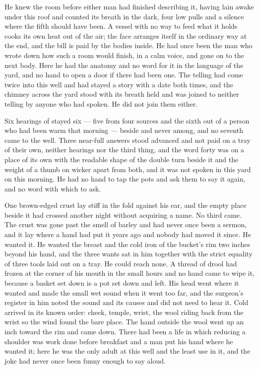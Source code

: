 He knew the room before either man had finished describing it, having lain awake under this roof and counted its breath in the dark, four low pulls and a silence where the fifth should have been. A vessel with no way to feed what it holds cooks its own heat out of the air; the face arranges itself in the ordinary way at the end, and the bill is paid by the bodies inside. He had once been the man who wrote down how such a room would finish, in a calm voice, and gone on to the next body. Here he had the anatomy and no word for it in the language of the yard, and no hand to open a door if there had been one. The telling had come twice into this well and had stayed a story with a date both times, and the chimney across the yard stood with its breath held and was joined to neither telling by anyone who had spoken. He did not join them either.

Six hearings of  stayed six — five from four sources and the sixth out of a person who had been warm that morning — beside and never among, and no seventh came to the well. Three near-full answers stood advanced and not paid on a tray of their own, neither hearings nor the third thing, and the word forty was on a place of its own with the readable shape of the double turn beside it and the weight of a thumb on wicker apart from both, and it was not spoken in this yard on this morning. He had no hand to tap the pots and ask them to say it again, and no  word with which to ask.

\scenebreak

One brown-edged crust lay stiff in the fold against his ear, and the empty place beside it had crossed another night without acquiring a name. No third came. The crust was gone past the smell of barley and had never once been a sermon, and it lay where a hand had put it years ago and nobody had moved it since. He wanted it. He wanted the breast and the cold iron of the bucket's rim two inches beyond his hand, and the three wants sat in him together with the strict equality of three tools laid out on a tray. He could reach none. A thread of drool had frozen at the corner of his mouth in the small hours and no hand came to wipe it, because a basket set down is a pot set down and left. His head went where it wanted and made the small wet sound when it went too far, and the surgeon's register in him noted the sound and its causes and did not need to hear it. Cold arrived in its known order: cheek, temple, wrist, the wool riding back from the wrist so the wind found the bare place. The hand outside the wool went up an inch toward the rim and came down. There had been a life in which reducing a shoulder was work done before breakfast and a man put his hand where he wanted it; here he was the only adult at this well and the least use in it, and the joke had never once been funny enough to say aloud.

